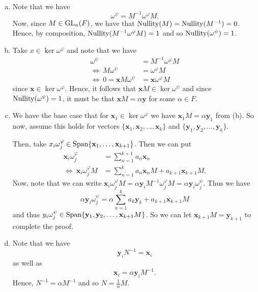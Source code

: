 \documentclass[leqno]{article}
\begin{document}
\begin{solution}~
\begin{enumerate}[(a)]
    \item Note that we have
    \[
    \omega^\psi = M^{-1} \omega^\varphi M.
    \]
    Now, since $M\in \mathrm{GL}_n(F)$, we have that $\mathrm{Nullity}(M)=\mathrm{Nullity}(M^{-1})=0$.  Hence, by composition, $\mathrm{Nullity}(M^{-1} \omega^\varphi M)=1$ and so $\mathrm{Nullity}(\omega^\psi)=1$.
    \item Take $x\in \ker \omega^\varphi$ and note that we have
    \begin{align*}
        \omega^\psi &= M^{-1} \omega^\varphi M\\
        \iff ~ M\omega^\psi &= \omega^\varphi M\\
        \iff ~ 0=\mathbf{x}M\omega^\psi &= \mathbf{x} \omega^\varphi M
    \end{align*}
    since $\mathbf{x}\in \ker \omega^\varphi$.  Hence, it follows that $\mathbf{x}M\in \ker \omega^\psi$ and since $\mathrm{Nullity}(\omega^\psi)=1$, it must be that $\mathbf{x}M=\alpha \mathbf{y}$ for some $\alpha \in F$.
    \item We have the base case that for $\mathbf{x}_1 \in \ker \omega^\varphi$ we have $\mathbf{x}_1 M = \alpha \mathbf{y}_1$ from (b).  So now, assume this holds for vectors $\{\mathbf{x}_1,\mathbf{x}_2,\dots,\mathbf{x}_k\}$ and $\{\mathbf{y}_1,\mathbf{y}_2,\dots,\mathbf{y}_k\}$. 
    
    Then, take $x_i \omega_j^\varphi \in {\rm Span}\{\mathbf{x}_1,\dots,\mathbf{x}_{k+1}\}$. Then we can put 
    \begin{align*}
        \mathbf{x}_i \omega_j^\varphi &= \sum_{n=1}^{k+1} a_n \mathbf{x}_n\\
        \iff~ \mathbf{x}_i \omega_j^\varphi M &= \sum_{n=1}^{k} a_n \mathbf{x}_nM + a_{k+1}\mathbf{x}_{k+1}M.
    \end{align*}
    Now, note that we can write $\mathbf{x}_i\omega_j^\varphi M=\alpha \mathbf{y}_i M^{-1}\omega_j^\varphi M = \alpha \mathbf{y}_i \omega_j^\psi$.  Thus we have 
    \[
    \alpha \mathbf{y}_i \omega_j^\psi = \alpha \sum_{n=1}^k a_k \mathbf{y}_k + a_{k+1} \mathbf{x}_{k+1} M
    \]
    and thus $y_i \omega_j^\psi \in {\rm Span}\{\mathbf{y}_1, \mathbf{y}_2,\dots,\mathbf{x}_{k+1}M\}$. So we can let $\mathbf{x}_{k+1}M=\mathbf{y}_{k+1}$ to complete the proof.  
    \item Note that we have
    \[
    \mathbf{y}_i N^{-1} = \mathbf{x}_i
    \]
    as well as
    \[
    \mathbf{x}_i = \alpha \mathbf{y}_i M^{-1}.
    \]
    Hence, $N^{-1} = \alpha M^{-1}$ and so $N=\frac{1}{\alpha}M$.
\end{enumerate}
\end{solution}
\end{document}
